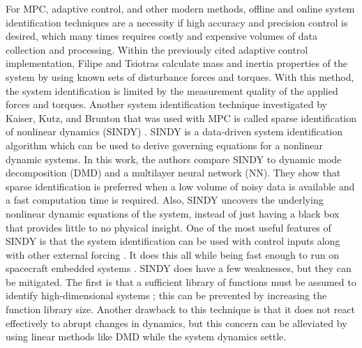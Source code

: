 \documentclass[letterpaper, preprint, paper,11pt]{AAS}	%
\begin{document}
For MPC, adaptive control, and other modern methods, offline and online system identification techniques are a necessity if high accuracy and precision control is desired, which many times requires costly and expensive volumes of data collection and processing. Within the previously cited adaptive control implementation, Filipe and Tsiotras calculate mass and inertia properties of the system by using known sets of disturbance forces and torques. With this method, the system identification is limited by the measurement quality of the applied forces and torques. Another system identification technique investigated by Kaiser, Kutz, and Brunton that was used with MPC is called sparse identification of nonlinear dynamics (SINDY) \cite{KaiserKutz_SINDyMPC}. SINDY is a data-driven system identification algorithm which can be used to derive governing equations for a nonlinear dynamic systems. In this work, the authors compare SINDY to dynamic mode decomposition (DMD) and a multilayer neural network (NN). They show that sparse identification is preferred when a low volume of noisy data is available and a fast computation time is required. Also, SINDY uncovers the underlying nonlinear dynamic equations of the system, instead of just having a black box that provides little to no physical insight. One of the most useful features of SINDY is that the system identification can be used with control inputs along with other external forcing \cite{BruntonProctor_SINDYc}. It does this all while being fast enough to run on spacecraft embedded systems \cite{ProvostBrunton_SINDyAnalysis}. SINDY does have a few weaknesses, but they can be mitigated. The first is that a sufficient library of functions must be assumed to identify high-dimensional systems \cite{KaiserKutz_SINDyMPC}; this can be prevented by increasing the function library size. Another drawback to this technique is that it does not react effectively to abrupt changes in dynamics, but this concern can be alleviated by using linear methods like DMD while the system dynamics settle.
\end{document}
